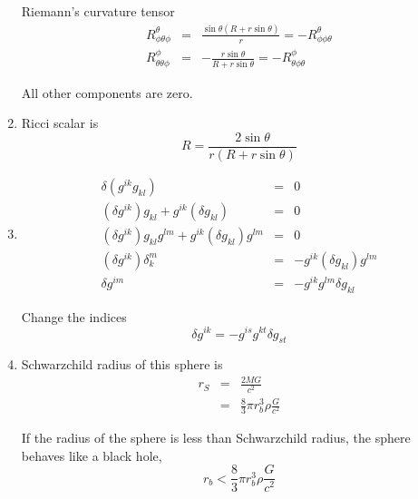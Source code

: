 \documentclass[12pt,a4paper]{article}
\begin{document}
\begin{enumerate}
Riemann's curvature tensor
\begin{eqnarray*}
	R^\theta_{\phi\theta\phi} &=& \frac{\sin\theta(R+r\sin\theta)}{r} = -	R^{\theta}_{\phi\phi\theta} \\
	R^\phi_{\theta\theta\phi} &=& -\frac{r\sin\theta}{R+r\sin\theta} = -R^\phi_{\theta\phi\theta}
\end{eqnarray*}

All other components are zero.




\item

Ricci scalar is
\begin{equation*}
	R=\frac{2\sin\theta}{r(R+r\sin\theta)}
\end{equation*}



\item
\begin{eqnarray*}
	\delta(g^{ik}g_{kl})&=&0 \\
	(\delta g^{ik})g_{kl} + g^{ik}(\delta g_{kl}) &=& 0 \\
	(\delta g^{ik})g_{kl}g^{lm} + g^{ik}(\delta g_{kl})g^{lm} &=& 0  \\
	(\delta g^{ik})\delta_k^m &=& - g^{ik}(\delta g_{kl})g^{lm} \\
	\delta g^{im} &=& - g^{ik} g^{lm} \delta g_{kl} 
\end{eqnarray*}

Change the indices
\begin{equation*}
	\delta g^{ik} = - g^{is}g^{kt}\delta g_{st}
\end{equation*}











\item

Schwarzchild radius of this sphere is
\begin{eqnarray*}
	r_S &=& \frac{2M G }{c^2}  \\
	&=& \frac{8}{3}\pi r_b^3 \rho \frac{G}{c^2}
\end{eqnarray*}

If the radius of the sphere is less than Schwarzchild radius, the sphere behaves like a black hole,
\begin{equation*}
	r_b < \frac{8}{3}\pi r_b^3 \rho \frac{G}{c^2}
\end{equation*}


\end{enumerate}
\end{document}
